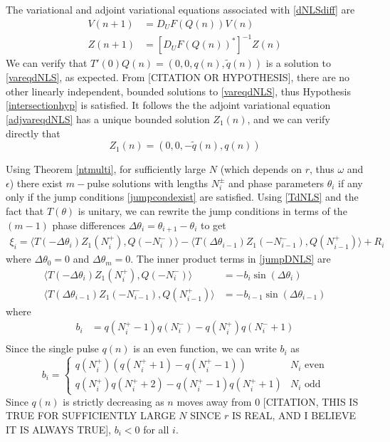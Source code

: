 \documentclass[12pt]{article}
\begin{document}
The variational and adjoint variational equations associated with \eqref{dNLSdiff} are
\begin{align}
V(n+1) &= D_U F(Q(n)) V(n) \label{vareqdNLS} \\
Z(n+1) &= [D_U F(Q(n))^*]^{-1} Z(n) \label{adjvareqdNLS}
\end{align}
We can verify that $T'(0) Q(n) = (0, 0, q(n), \tilde{q}(n))$ is a solution to \eqref{vareqdNLS}, as expected. From [CITATION OR HYPOTHESIS], there are no other linearly independent, bounded solutions to \eqref{vareqdNLS}, thus Hypothesis \ref{intersectionhyp} is satisfied. It follows the the adjoint variational equation \eqref{adjvareqdNLS} has a unique bounded solution $Z_1(n)$, and we can verify directly that
\begin{equation}\label{defZ1}
Z_1(n) = (0, 0, -\tilde{q}(n), q(n))
\end{equation}

Using Theorem \ref{ntmulti}, for sufficiently large $N$ (which depends on $r$, thus $\omega$ and $\epsilon$) there exist $m-$pulse solutions with lengths $N_i^\pm$ and phase parameters $\theta_i$ if any only if the jump conditions \eqref{jumpcondexist} are satisfied. Using \eqref{TdNLS} and the fact that $T(\theta)$ is unitary, we can rewrite the jump conditions in terms of the $(m - 1)$ phase differences $\Delta \theta_i = \theta_{i+1} - \theta_i$ to get
\begin{align}\label{jumpDNLS}
\xi_i = \langle T(-\Delta \theta_i) Z_1(N_i^+), Q(-N_i^-) \rangle
- \langle T(\Delta \theta_{i-1}) Z_1(-N_{i-1}^-), Q(N_{i-1}^+) \rangle + R_i
\end{align}
where $\Delta \theta_0 = 0$ and $\Delta \theta_m = 0$. The inner product terms in \eqref{jumpDNLS} are
\begin{equation}\label{jumpIPs}
\begin{aligned}
\langle T(-\Delta\theta_i) Z_1(N_i^+), Q(-N_i^-) \rangle 
&= -b_i \sin(\Delta\theta_i) \\
\langle T(\Delta\theta_{i-1}) Z_1(-N_{i-1}^-), Q(N_{i-1}^+) \rangle &= -b_{i-1} \sin(\Delta\theta_{i-1})
\end{aligned}
\end{equation}
where 
\begin{align*}
b_i &= q(N_i^+ - 1)q(N_i^-) - q(N_i^+)q(N_i^- + 1) \\
\end{align*}
Since the single pulse $q(n)$ is an even function, we can write $b_i$ as
\begin{equation}\label{bieq}
b_i = \begin{cases}
q(N_i^+)\left( q(N_i^+ + 1) - q(N_i^+ - 1) \right) & N_i \text{ even} \\
q(N_i^+)q(N_i^+ + 2) - q(N_i^+ - 1)q(N_i^+ + 1) & N_i \text{ odd}
\end{cases}
\end{equation}
Since $q(n)$ is strictly decreasing as $n$ moves away from 0 [CITATION, THIS IS TRUE FOR SUFFICIENTLY LARGE $N$ SINCE $r$ IS REAL, AND I BELIEVE IT IS ALWAYS TRUE], $b_i < 0$ for all $i$. 
\end{document}
